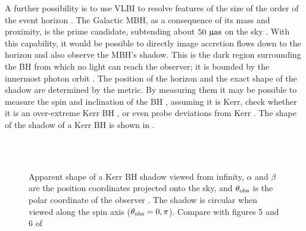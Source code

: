 A further possibility is to use VLBI to resolve features of the size of the order of the event horizon \citep{Doeleman2008,Fish2010}. The Galactic MBH, as a consequence of its mass and proximity, is the prime candidate, subtending about $50~\mathrm{\upmu as}$ on the sky \citep{Broderick2009a,Johannsen2012a}. With this capability, it would be possible to directly image accretion flows down to the horizon and also observe the MBH's shadow. This is the dark region surrounding the BH from which no light can reach the observer; it is bounded by the innermost photon orbit \citep[section 63]{Chandrasekhar1992}. The position of the horizon and the exact shape of the shadow are determined by the metric. By measuring them it may be possible to measure the spin and inclination of the BH \citep{Hioki2009a}, assuming it is Kerr, check whether it is an over-extreme Kerr BH \citep{Bambi2009}, or even probe deviations from Kerr \citep{Johannsen2010a, Johannsen2010b}. %
The shape of the shadow of a Kerr BH is shown in . 
\begin{figure}
\vspace{0.5\baselineskip}
  \centering
    \quad
    \quad
    \\
    \quad
    \quad
    \\
    \quad  
    \caption{Apparent shape of a Kerr BH shadow viewed from infinity, $\alpha$ and $\beta$ are the position coordinates projected onto the sky, and $\theta_\mathrm{obs}$ is the polar coordinate of the observer \citep[section 63]{Chandrasekhar1992}. The shadow is circular when viewed along the spin axis ($\theta_\mathrm{obs} = 0, \pi$). Compare with figures 5 and 6 of \citet{Chan2013}} 
    \label{fig:Shadow}
\end{figure}
